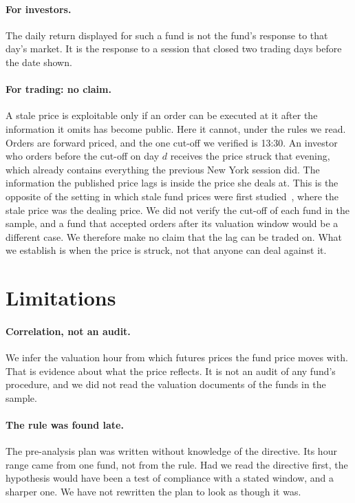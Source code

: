 \documentclass[11pt,a4paper]{article}
\begin{document}
\paragraph{For investors.} The daily return displayed for such a fund is not
the fund's response to that day's market. It is the response to a session that
closed two trading days before the date shown.

\paragraph{For trading: no claim.} A stale price is exploitable only if an
order can be executed at it after the information it omits has become public.
Here it cannot, under the rules we read. Orders are forward priced, and the
one cut-off we verified is 13:30. An investor who orders before the cut-off on
day $d$ receives the price struck that evening, which already contains
everything the previous New York session did. The information the published
price lags is inside the price she deals at. This is the opposite of the
setting in which stale fund prices were first
studied~\cite{chalmers2001perils,zitzewitz2003cares}, where the stale price
was the dealing price. We did not verify the cut-off of each fund in the
sample, and a fund that accepted orders after its valuation window would be a
different case.
We therefore make no claim that the lag can be traded on. What we establish is
when the price is struck, not that anyone can deal against it.

\section{Limitations}\label{sec:limits}

\paragraph{Correlation, not an audit.} We infer the valuation hour from which
futures prices the fund price moves with. That is evidence about what the
price reflects. It is not an audit of any fund's procedure, and we did not
read the valuation documents of the funds in the sample.

\paragraph{The rule was found late.} The pre-analysis plan was written without
knowledge of the directive. Its hour range came from one fund, not from the
rule. Had we read the directive first, the hypothesis would have been a test
of compliance with a stated window, and a sharper one. We have not rewritten
the plan to look as though it was.
\end{document}
